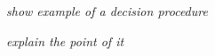 % 








\textit{show example of a decision procedure}

\textit{explain the point of it}














